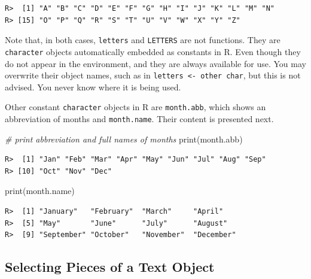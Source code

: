 \documentclass[
  12pt,
]{book}
\newenvironment{Shaded}{\begin{snugshade}}{\end{snugshade}}
\newcommand{\CommentTok}[1]{\textcolor[rgb]{0.37,0.37,0.37}{\textit{#1}}}
\newcommand{\FunctionTok}[1]{\textcolor[rgb]{0,0,0}{#1}}
\newcommand{\NormalTok}[1]{#1}
\begin{document}
\begin{verbatim}
R>  [1] "A" "B" "C" "D" "E" "F" "G" "H" "I" "J" "K" "L" "M" "N"
R> [15] "O" "P" "Q" "R" "S" "T" "U" "V" "W" "X" "Y" "Z"
\end{verbatim}

Note that, in both cases, \texttt{letters} and \texttt{LETTERS} are not functions. They are \texttt{character} objects automatically embedded as constants in R. Even though they do not appear in the environment, and they are always available for use. You may overwrite their object names, such as in \texttt{letters\ \textless{}-\ \textquotesingle{}other\ char\textquotesingle{}}, but this is not advised. You never know where it is being used.

Other constant \texttt{character} objects in R are \texttt{month.abb}, which shows an abbreviation of months and \texttt{month.name}. Their content is presented next.    

\begin{Shaded}
\begin{Highlighting}[]
\CommentTok{\# print abbreviation and full names of months}
\FunctionTok{print}\NormalTok{(month.abb)}
\end{Highlighting}
\end{Shaded}

\begin{verbatim}
R>  [1] "Jan" "Feb" "Mar" "Apr" "May" "Jun" "Jul" "Aug" "Sep"
R> [10] "Oct" "Nov" "Dec"
\end{verbatim}

\begin{Shaded}
\begin{Highlighting}[]
\FunctionTok{print}\NormalTok{(month.name)}
\end{Highlighting}
\end{Shaded}

\begin{verbatim}
R>  [1] "January"   "February"  "March"     "April"    
R>  [5] "May"       "June"      "July"      "August"   
R>  [9] "September" "October"   "November"  "December"
\end{verbatim}

\hypertarget{selecting-pieces-of-a-text-object}{%
\subsection{Selecting Pieces of a Text Object}\label{selecting-pieces-of-a-text-object}}
\end{document}
